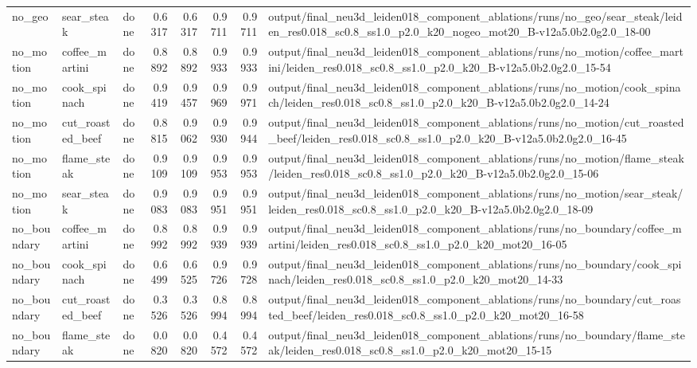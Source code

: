 \documentclass[10pt]{article}
\begin{document}
\begin{longtable}{lllrrrrp{9cm}}
no\_geo & sear\_steak & done & 0.6317 & 0.6317 & 0.9711 & 0.9711 & output/final\_neu3d\_leiden018\_component\_ablations/runs/no\_geo/sear\_steak/leiden\_res0.018\_sc0.8\_ss1.0\_p2.0\_k20\_nogeo\_mot20\_B-v12a5.0b2.0g2.0\_18-00 \\
no\_motion & coffee\_martini & done & 0.8892 & 0.8892 & 0.9933 & 0.9933 & output/final\_neu3d\_leiden018\_component\_ablations/runs/no\_motion/coffee\_martini/leiden\_res0.018\_sc0.8\_ss1.0\_p2.0\_k20\_B-v12a5.0b2.0g2.0\_15-54 \\
no\_motion & cook\_spinach & done & 0.9419 & 0.9457 & 0.9969 & 0.9971 & output/final\_neu3d\_leiden018\_component\_ablations/runs/no\_motion/cook\_spinach/leiden\_res0.018\_sc0.8\_ss1.0\_p2.0\_k20\_B-v12a5.0b2.0g2.0\_14-24 \\
no\_motion & cut\_roasted\_beef & done & 0.8815 & 0.9062 & 0.9930 & 0.9944 & output/final\_neu3d\_leiden018\_component\_ablations/runs/no\_motion/cut\_roasted\_beef/leiden\_res0.018\_sc0.8\_ss1.0\_p2.0\_k20\_B-v12a5.0b2.0g2.0\_16-45 \\
no\_motion & flame\_steak & done & 0.9109 & 0.9109 & 0.9953 & 0.9953 & output/final\_neu3d\_leiden018\_component\_ablations/runs/no\_motion/flame\_steak/leiden\_res0.018\_sc0.8\_ss1.0\_p2.0\_k20\_B-v12a5.0b2.0g2.0\_15-06 \\
no\_motion & sear\_steak & done & 0.9083 & 0.9083 & 0.9951 & 0.9951 & output/final\_neu3d\_leiden018\_component\_ablations/runs/no\_motion/sear\_steak/leiden\_res0.018\_sc0.8\_ss1.0\_p2.0\_k20\_B-v12a5.0b2.0g2.0\_18-09 \\
no\_boundary & coffee\_martini & done & 0.8992 & 0.8992 & 0.9939 & 0.9939 & output/final\_neu3d\_leiden018\_component\_ablations/runs/no\_boundary/coffee\_martini/leiden\_res0.018\_sc0.8\_ss1.0\_p2.0\_k20\_mot20\_16-05 \\
no\_boundary & cook\_spinach & done & 0.6499 & 0.6525 & 0.9726 & 0.9728 & output/final\_neu3d\_leiden018\_component\_ablations/runs/no\_boundary/cook\_spinach/leiden\_res0.018\_sc0.8\_ss1.0\_p2.0\_k20\_mot20\_14-33 \\
no\_boundary & cut\_roasted\_beef & done & 0.3526 & 0.3526 & 0.8994 & 0.8994 & output/final\_neu3d\_leiden018\_component\_ablations/runs/no\_boundary/cut\_roasted\_beef/leiden\_res0.018\_sc0.8\_ss1.0\_p2.0\_k20\_mot20\_16-58 \\
no\_boundary & flame\_steak & done & 0.0820 & 0.0820 & 0.4572 & 0.4572 & output/final\_neu3d\_leiden018\_component\_ablations/runs/no\_boundary/flame\_steak/leiden\_res0.018\_sc0.8\_ss1.0\_p2.0\_k20\_mot20\_15-15 \\

\end{longtable}
\end{document}
